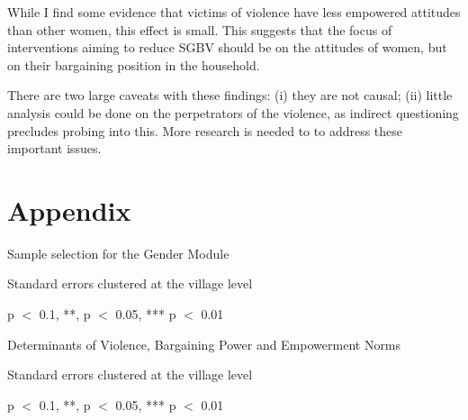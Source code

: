 \documentclass[10pt,a4paper,abstract=on]{scrartcl} %
\begin{document}
While I find some evidence that victims of violence have less empowered attitudes than other women, this effect is small. This suggests that the focus of interventions aiming to reduce SGBV should be on the attitudes of women, but on their bargaining position in the household.

There are two large caveats with these findings: (i) they are not causal; (ii) little analysis could be done on the perpetrators of the violence, as indirect questioning precludes probing into this. More research is needed to  to address these important issues.

\clearpage 



\clearpage
\section*{Appendix}
\setcounter{table}{0}
\renewcommand{\thetable}{A\arabic{table}}

\begin{threeparttable}[htb]
	\caption{Sample selection for the Gender Module}\label{tab:sample_selection}
	\begin{center}
	
	\begin{tablenotes}
	\small
	 \item Standard errors clustered at the village level
	 \item * p $<$ 0.1, **, p $<$ 0.05, *** p $<$ 0.01
	\end{tablenotes}
	\end{center}
\end{threeparttable}

\begin{landscape}


\begin{threeparttable}
	\caption{Determinants of Violence, Bargaining Power and Empowerment Norms}\label{tab:determinants_regression}
	\tiny
	\centering
	
	
	\begin{tablenotes}
	\tiny
	 \item Standard errors clustered at the village level
	 \item * p $<$ 0.1, **, p $<$ 0.05, *** p $<$ 0.01
	\end{tablenotes}
\end{threeparttable}
\end{landscape}
\end{document}
